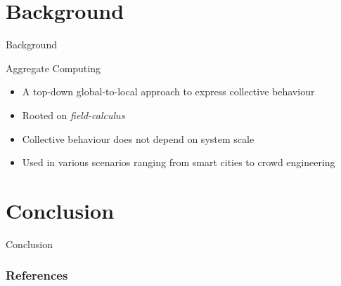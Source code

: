 \documentclass[8pt, aspectratio=169]{beamer}
\begin{document}
\begin{frame}[plain]
\titlepage
\end{frame}

\section{Background}
\begin{frame}{Background}
  \begin{card}

  \end{card}
  \begin{alarm}[Challenges]

  \end{alarm}
\end{frame}

\begin{frame}{Aggregate Computing}
  \begin{cardTiny}
    \begin{itemize}
      \item <1-> A top-down global-to-local approach to express collective behaviour
      \item <2-> Rooted on \textit{field-calculus}~\cite{DBLP:conf/coordination/AudritoBDV18}
      \item <3-> Collective behaviour does not depend on system scale
      \item <4-> Used in various scenarios ranging from smart cities to crowd engineering~\cite{DBLP:conf/coordination/CasadeiPVN19}
    \end{itemize}
  \end{cardTiny}
\end{frame}

\section{Conclusion}
\begin{frame}{Conclusion}

\end{frame}


\begin{frame}[allowframebreaks]
  \frametitle{References}
  \printbibliography
\end{frame}
\end{document}
